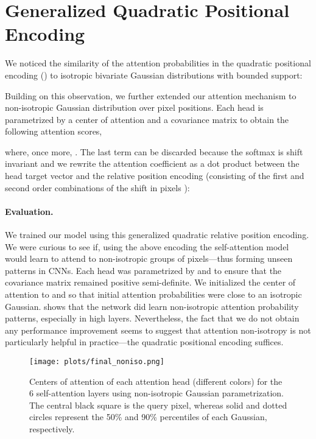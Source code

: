 \documentclass{article} \usepackage{iclr2020_conference,times}
\begin{document}
\section{Generalized Quadratic Positional Encoding}
\label{ssec:non_isotropic}

We noticed the similarity of the attention probabilities in the quadratic positional encoding () to isotropic bivariate Gaussian distributions with bounded support:

Building on this observation, we further extended our attention mechanism to non-isotropic Gaussian distribution over pixel positions.
Each head is parametrized by a center of attention  and a covariance matrix  to obtain the following attention scores,

where, once more, .
The last term can be discarded because the softmax is shift invariant and we rewrite the attention coefficient as a dot product between the head target vector  and the relative position encoding  (consisting of the first and second order combinations of the shift in pixels ):


\paragraph{Evaluation.}
We trained our model using this generalized quadratic relative position encoding.
We were curious to see if, using the above encoding the self-attention model would learn to attend to non-isotropic groups of pixels---thus forming unseen patterns in CNNs.
Each head was parametrized by  and  to ensure that the covariance matrix remained positive semi-definite.
We initialized the center of attention to  and  so that initial attention probabilities were close to an isotropic Gaussian.
 shows that the network did learn non-isotropic attention probability patterns, especially in high layers.
Nevertheless, the fact that we do not obtain any performance improvement seems to suggest that attention non-isotropy is not particularly helpful in practice---the quadratic positional encoding suffices.

\begin{figure}[h]
  \texttt{[image: plots/final\_noniso.png]}
  \caption{Centers of attention of each attention head (different colors) for the 6 self-attention layers using non-isotropic Gaussian parametrization.
    The central black square is the query pixel, whereas solid and dotted circles represent the 50\% and 90\% percentiles of each Gaussian, respectively.}
  \label{fig:noniso_attention_final}
\end{figure}
\end{document}
